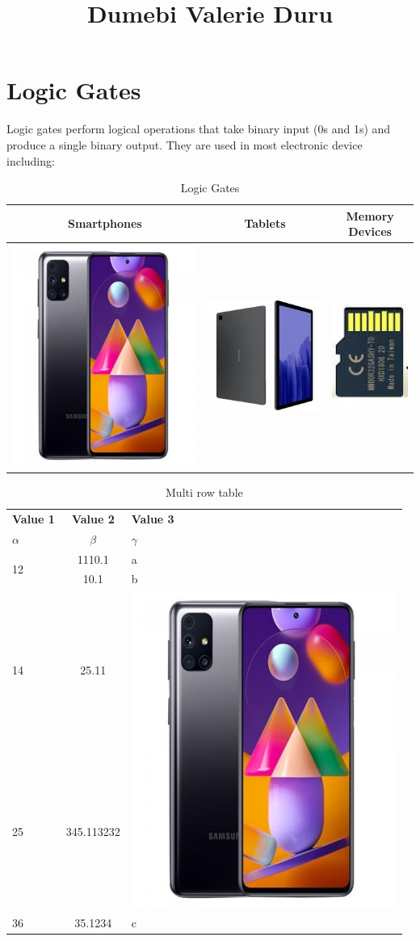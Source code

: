 \documentclass{article}
\begin{document}
		\title{Dumebi Valerie Duru}
		\maketitle
	\section{Logic Gates}
			Logic gates perform logical operations that take binary input (0s and 1s) and produce a single binary output. They are used in most electronic device including:
			\cite{hall2019opportunity}

	\begin{table}[h!]
		\begin{center}
			\caption{Logic Gates}
			\label{tab: table 1}
			\begin{tabular}{|c|c|c|}
					\hline
					Smartphones & Tablets & Memory Devices\\
					\hline
					\includegraphics[width=0.1\linewidth]{phone.jpg} & \includegraphics[width=0.1\linewidth]{tablet.jpg} &
					 \includegraphics[width=0.1\linewidth]{memory device.jpg}\\
					\hline  			
			\end{tabular}
		\end{center}	
	\end{table}

	\begin{table}[h!]
		\caption{Multi row table}
		\label{tab: table 2}
		\begin{center}
		\begin{tabular}{|l|c|l|}
			\hline
			\textbf{Value 1} & \textbf{Value 2} & \textbf{Value 3}\\
			$\alpha$ & $\beta$ & $\gamma$\\ 
			\hline
			\multirow{2}{*}{12} & 1110.1 & a\\
			& 10.1 & b\\
			\hline
			14 & 25.11 & \multirow{2}{*}{\includegraphics[width=0.05\linewidth]{phone.jpg}}\\
			25 & 345.113232 & \\
			\hline
			36 & 35.1234 & c\\
			\hline
			
		\end{tabular}
		\end{center}
	\end{table}
\end{document}
